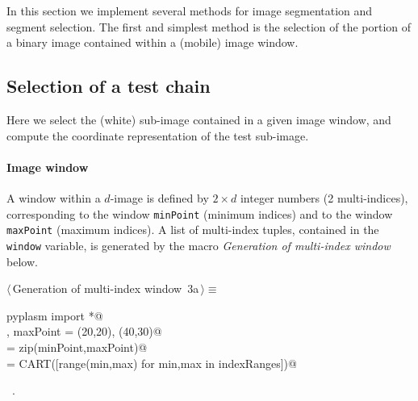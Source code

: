 \documentclass[11pt,oneside]{article}	%
\begin{document}
In this section we implement several methods for image segmentation and segment selection. The first and simplest method is the selection of the portion of a binary image contained within a (mobile) image window.

\subsection{Selection of a test chain}

Here we select the (white) sub-image contained in a given image window, and compute the coordinate representation of the test sub-image.

\paragraph{Image window}

A window within a $d$-image is defined by $2\times d$ integer numbers (2 multi-indices), corresponding to the window  \texttt{minPoint} (minimum indices) and to the window \texttt{maxPoint} (maximum indices). A list of multi-index tuples, contained in the \texttt{window} variable, is generated by the macro \emph{Generation of multi-index window} below.

\begin{flushleft} \small
\begin{minipage}{\linewidth} \label{scrap3}
\protect{}$\langle\,$Generation of multi-index window\nobreak\ {\footnotesize 3a}$\,\rangle\equiv$
\vspace{-1ex}
\begin{list}{}{} \item
\mbox{}\verb@from pyplasm import *@\\
\mbox{}\verb@minPoint, maxPoint = (20,20), (40,30)@\\
\mbox{}\verb@indexRanges = zip(minPoint,maxPoint)@\\
\mbox{}\verb@window = CART([range(min,max) for min,max in indexRanges])@\\
\mbox{}\verb@@{\NWsep}
\end{list}
\vspace{-1ex}
\footnotesize\addtolength{\baselineskip}{-1ex}
\begin{list}{}{\setlength{\itemsep}{-\parsep}\setlength{\itemindent}{-\leftmargin}}
\item \NWtxtMacroRefIn\ .
\end{list}
\end{minipage}\\[4ex]
\end{flushleft}
\end{document}
